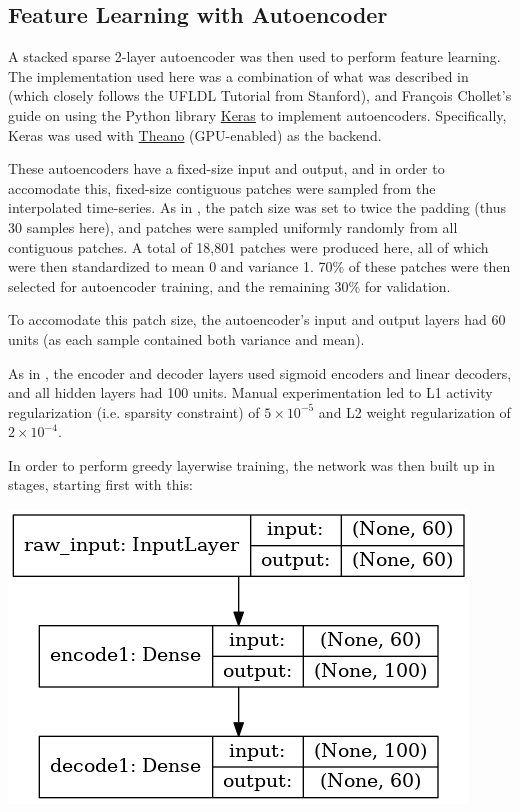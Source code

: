 \documentclass[journal]{IEEEtran}
\begin{document}
\subsection{Feature Learning with Autoencoder}

A stacked sparse 2-layer autoencoder was then used to perform feature
learning.  The implementation used here was a combination of what was
described in \cite{Lasko2013} (which closely follows the UFLDL
Tutorial from Stanford\cite{Ng}), and Fran\c cois Chollet's
guide\cite{Chollet} on using the Python library
\href{https://keras.io/}{Keras} to implement autoencoders.
Specifically, Keras was used with
\href{http://deeplearning.net/software/theano/}{Theano} (GPU-enabled)
as the backend.

These autoencoders have a fixed-size input and output, and in order to
accomodate this, fixed-size contiguous patches were sampled from the
interpolated time-series.  As in \cite{Lasko2013}, the patch size was
set to twice the padding (thus 30 samples here), and patches were
sampled uniformly randomly from all contiguous patches.  A total of
18,801 patches were produced here, all of which were then standardized
to mean 0 and variance 1.  70\% of these patches were then selected
for autoencoder training, and the remaining 30\% for validation.

To accomodate this patch size, the autoencoder's input and output
layers had 60 units (as each sample contained both variance and mean).

As in \cite{Lasko2013}, the encoder and decoder layers used sigmoid
encoders and linear decoders, and all hidden layers had 100 units.
Manual experimentation led to L1 activity regularization
(i.e. sparsity constraint) of $5\times10^{-5}$ and L2 weight
regularization of $2\times10^{-4}$.

In order to perform greedy layerwise training\cite{Ng}, the network
was then built up in stages, starting first with this:

\includegraphics[width=0.7\linewidth]{keras_autoencoder1.png}
\end{document}
